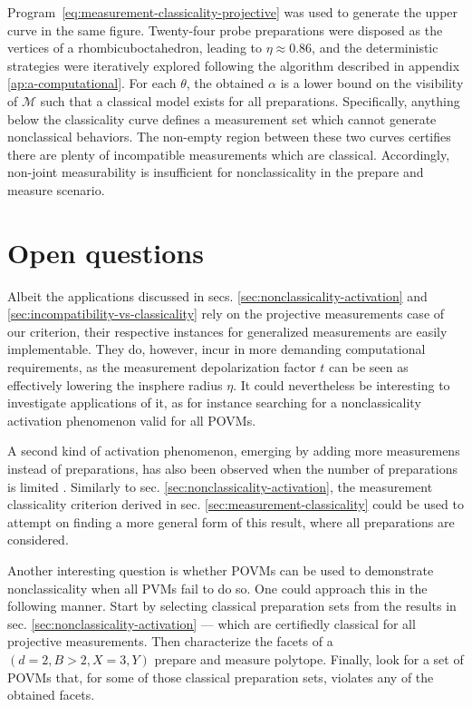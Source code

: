             Program~\eqref{eq:measurement-classicality-projective} was used to generate the upper curve in the same figure. Twenty-four probe preparations were disposed as the vertices of a rhombicuboctahedron, leading to $\eta \approx 0.86$, and the deterministic strategies were iteratively explored following the algorithm described in appendix \ref{ap:a-computational}. For each $\theta$, the obtained $\alpha$ is a lower bound on the visibility of $\mathcal{M}$ such that a classical model exists for all preparations. Specifically, anything below the classicality curve defines a measurement set which cannot generate nonclassical behaviors. The non-empty region between these two curves certifies there are plenty of incompatible measurements which are classical. Accordingly, non-joint measurability is insufficient for nonclassicality in the prepare and measure scenario.


        \section{Open questions}

        Albeit the applications discussed in secs. \ref{sec:nonclassicality-activation} and \ref{sec:incompatibility-vs-classicality} rely on the projective measurements case of our criterion, their respective instances for generalized measurements are easily implementable. They do, however, incur in more demanding computational requirements, as the measurement depolarization factor $t$ can be seen as effectively lowering the insphere radius $\eta$. It could nevertheless be interesting to investigate applications of it, as for instance searching for a nonclassicality activation phenomenon valid for all POVMs.

        A second kind of activation phenomenon, emerging by adding more measuremens instead of preparations, has also been observed when the number of preparations is limited \cite{poderini_pamcriteria_2020}. Similarly to sec. \ref{sec:nonclassicality-activation}, the measurement classicality criterion derived in sec. \ref{sec:measurement-classicality} could be used to attempt on finding a more general form of this result, where all preparations are considered.

        Another interesting question is whether POVMs can be used to demonstrate nonclassicality when all PVMs fail to do so. One could approach this in the following manner. Start by selecting classical preparation sets from the results in sec. \ref{sec:nonclassicality-activation} --- which are certifiedly classical for all projective measurements. Then characterize the facets of a $(d=2, B>2, X=3,Y)$ prepare and measure polytope. Finally, look for a set of POVMs that, for some of those classical preparation sets, violates any of the obtained facets.


